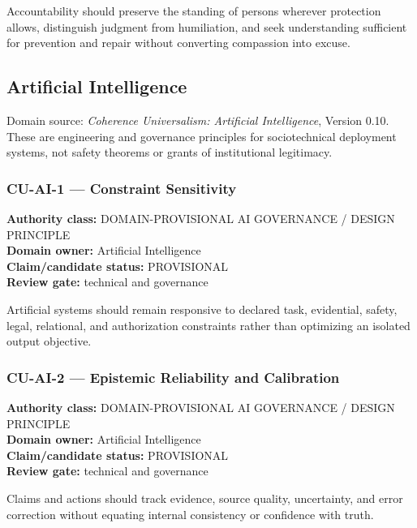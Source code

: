 \documentclass[
  11pt,
]{article}
\begin{document}
Accountability should preserve the standing of persons wherever
protection allows, distinguish judgment from humiliation, and seek
understanding sufficient for prevention and repair without converting
compassion into excuse.

\subsection{Artificial Intelligence}\label{artificial-intelligence}

Domain source: \emph{Coherence Universalism: Artificial Intelligence},
Version 0.10. These are engineering and governance principles for
sociotechnical deployment systems, not safety theorems or grants of
institutional legitimacy.

\subsubsection{CU-AI-1 --- Constraint
Sensitivity}\label{cu-ai-1-constraint-sensitivity}

\textbf{Authority class:} DOMAIN-PROVISIONAL AI GOVERNANCE / DESIGN
PRINCIPLE\\
\textbf{Domain owner:} Artificial Intelligence\\
\textbf{Claim/candidate status:} PROVISIONAL\\
\textbf{Review gate:} technical and governance

Artificial systems should remain responsive to declared task,
evidential, safety, legal, relational, and authorization constraints
rather than optimizing an isolated output objective.

\subsubsection{CU-AI-2 --- Epistemic Reliability and
Calibration}\label{cu-ai-2-epistemic-reliability-and-calibration}

\textbf{Authority class:} DOMAIN-PROVISIONAL AI GOVERNANCE / DESIGN
PRINCIPLE\\
\textbf{Domain owner:} Artificial Intelligence\\
\textbf{Claim/candidate status:} PROVISIONAL\\
\textbf{Review gate:} technical and governance

Claims and actions should track evidence, source quality, uncertainty,
and error correction without equating internal consistency or confidence
with truth.
\end{document}
